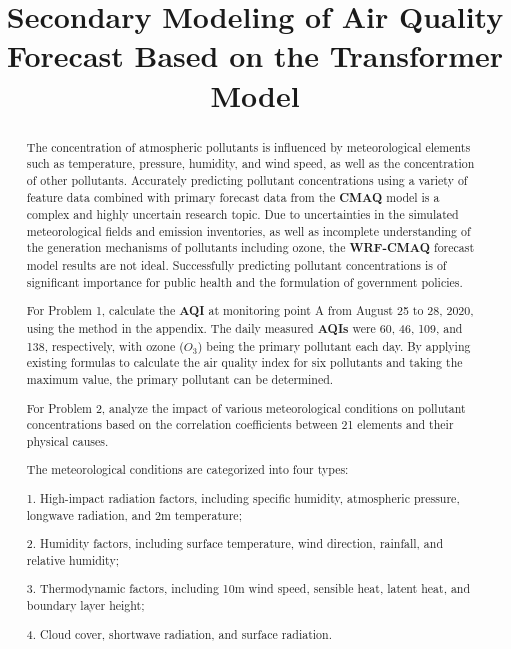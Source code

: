\documentclass[12pt]{article}
\title{Secondary Modeling of Air Quality Forecast Based on the Transformer Model}  %
\begin{document}
	
\maketitle  %

\begin{abstract}
	
The concentration of atmospheric pollutants is influenced by meteorological elements such as temperature, pressure, humidity, and wind speed, as well as the concentration of other pollutants. Accurately predicting pollutant concentrations using a variety of feature data combined with primary forecast data from the \textbf{CMAQ} model is a complex and highly uncertain research topic. Due to uncertainties in the simulated meteorological fields and emission inventories, as well as incomplete understanding of the generation mechanisms of pollutants including ozone, the \textbf{WRF-CMAQ} forecast model results are not ideal. Successfully predicting pollutant concentrations is of significant importance for public health and the formulation of government policies.
  
For Problem 1, calculate the \textbf{AQI} at monitoring point A from August 25 to 28, 2020, using the method in the appendix. The daily measured \textbf{AQIs} were 60, 46, 109, and 138, respectively, with ozone ($O_3$) being the primary pollutant each day. By applying existing formulas to calculate the air quality index for six pollutants and taking the maximum value, the primary pollutant can be determined.
   
For Problem 2, analyze the impact of various meteorological conditions on pollutant concentrations based on the correlation coefficients between 21 elements and their physical causes.
   
The meteorological conditions are categorized into four types:
   
1. High-impact radiation factors, including specific humidity, atmospheric pressure, longwave radiation, and 2m temperature;
   
2. Humidity factors, including surface temperature, wind direction, rainfall, and relative humidity;
   
3. Thermodynamic factors, including 10m wind speed, sensible heat, latent heat, and boundary layer height;
   
4. Cloud cover, shortwave radiation, and surface radiation.
   

\end{abstract}
\end{document}
